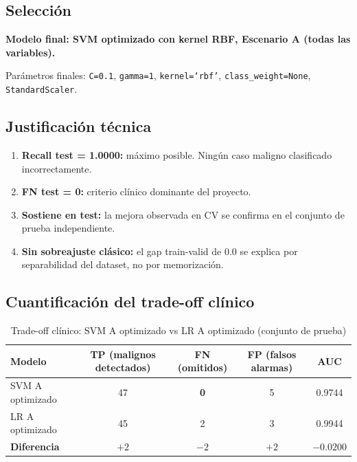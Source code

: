 \documentclass[11pt,a4paper]{article}
\begin{document}
\subsection{Selección}

\textbf{Modelo final: SVM optimizado con kernel RBF, Escenario A (todas las variables).}

Parámetros finales: \texttt{C=0.1}, \texttt{gamma=1}, \texttt{kernel=`rbf'}, \texttt{class\_weight=None}, \texttt{StandardScaler}.

\subsection{Justificación técnica}

\begin{enumerate}[leftmargin=1.4cm]
\item \textbf{Recall test = 1.0000:} máximo posible. Ningún caso maligno clasificado incorrectamente.
\item \textbf{FN test = 0:} criterio clínico dominante del proyecto.
\item \textbf{Sostiene en test:} la mejora observada en CV se confirma en el conjunto de prueba independiente.
\item \textbf{Sin sobreajuste clásico:} el gap train-valid de 0.0 se explica por separabilidad del dataset, no por memorización.
\end{enumerate}

\subsection{Cuantificación del trade-off clínico}

\begin{table}[H]
\centering
\caption{Trade-off clínico: SVM A optimizado vs LR A optimizado (conjunto de prueba)}
\renewcommand{\arraystretch}{1.2}
\begin{tabular}{lcccc}
\toprule
\textbf{Modelo} & \textbf{TP (malignos detectados)} & \textbf{FN (omitidos)} & \textbf{FP (falsos alarmas)} & \textbf{AUC} \\
\midrule
\rowcolor{bestrow}
SVM A optimizado & 47 & \textbf{0} & 5 & 0.9744 \\
LR A optimizado & 45 & 2 & 3 & 0.9944 \\
\midrule
\textbf{Diferencia} & $+2$ & $-2$ & $+2$ & $-0.0200$ \\
\bottomrule
\end{tabular}
\end{table}
\end{document}
